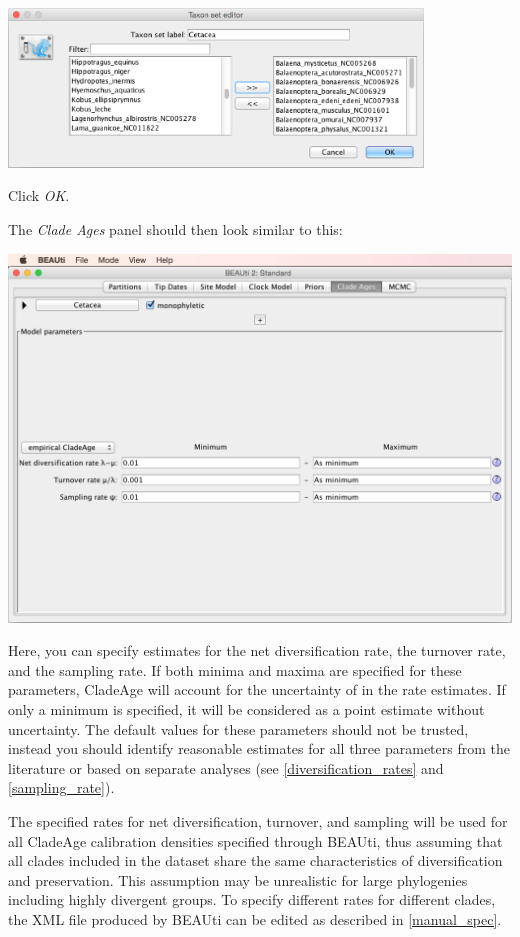\documentclass{article}
\begin{document}
\begin{center}\includegraphics[width=0.825\textwidth]{fig7.png}\end{center}

\noindent
Click \emph{OK}.

\newpage
\noindent
The \emph{Clade Ages} panel should then look similar to this:

\begin{center}\includegraphics[width=\textwidth]{fig8.png}\end{center}

\noindent
Here, you can specify estimates for the net diversification rate, the turnover rate, and the sampling rate. If both minima and maxima are specified for these parameters, CladeAge will account for the uncertainty of in the rate estimates. If only a minimum is specified, it will be considered as a point estimate without uncertainty. The default values for these parameters should not be trusted, instead you should identify reasonable estimates for all three parameters from the literature or based on separate analyses (see \ref{diversification_rates} and  \ref{sampling_rate}).

The specified rates for net diversification, turnover, and sampling will be used for all CladeAge calibration densities specified through BEAUti, thus assuming that all clades included in the dataset share the same characteristics of diversification and preservation. This assumption may be unrealistic for large phylogenies including highly divergent groups. To specify different rates for different clades, the XML file produced by BEAUti can be edited as described in \ref{manual_spec}.
\end{document}
